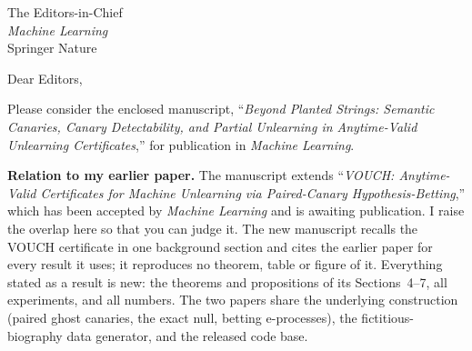 \documentclass[10pt,a4paper]{letter}
\date{13 November 2026}
\begin{document}
\begin{letter}{The Editors-in-Chief\\\emph{Machine Learning}\\Springer Nature}

\opening{Dear Editors,}

Please consider the enclosed manuscript, ``\emph{Beyond Planted Strings: Semantic
Canaries, Canary Detectability, and Partial Unlearning in Anytime-Valid Unlearning
Certificates},'' for publication in \emph{Machine Learning}.

\textbf{Relation to my earlier paper.} The manuscript extends ``\emph{VOUCH: Anytime-Valid
Certificates for Machine Unlearning via Paired-Canary Hypothesis-Betting},'' which has
been accepted by \emph{Machine Learning} and is awaiting publication. I raise the overlap
here so that you can judge it. The new manuscript recalls the VOUCH
certificate in one background section and cites the earlier paper for every result it
uses; it reproduces no theorem, table or figure of it. Everything stated as a result is
new: the theorems and propositions of its Sections~4--7, all experiments, and all
numbers. The two papers share the underlying construction (paired ghost canaries, the
exact null, betting e-processes), the fictitious-biography data generator, and the
released code base.


\end{letter}
\end{document}

